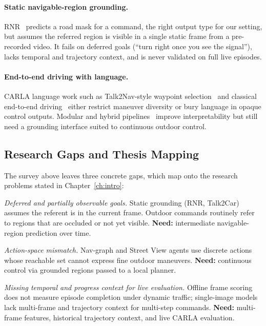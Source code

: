 \paragraph{Static navigable-region grounding.}
RNR~\cite{Rufus_2021} predicts a road mask for a command, the right output type for our setting, but assumes the referred region is visible in a single static frame from a pre-recorded video. It fails on deferred goals (``turn right once you see the signal''), lacks temporal and trajectory context, and is never validated on full live episodes.

\paragraph{End-to-end driving with language.}
CARLA language work such as Talk2Nav-style waypoint selection~\cite{sriram2019talk} and classical end-to-end driving~\cite{Codevilla_Muller_Lopez_Koltun_Dosovitskiy_2018,bojarski2016end} either restrict maneuver diversity or bury language in opaque control outputs. Modular and hybrid pipelines~\cite{Misra_Langford_Artzi_2017,fried2018speaker} improve interpretability but still need a grounding interface suited to continuous outdoor control.

\subsection{Research Gaps and Thesis Mapping}
\label{sec:research_gaps}

The survey above leaves three concrete gaps, which map onto the research problems stated in Chapter~\ref{ch:intro}:

\begin{description}[style=nextline, leftmargin=1.5em, font=\normalfont\bfseries]
    \item[Gap A $\rightarrow$ Problem A] \textit{Deferred and partially observable goals.} Static grounding (RNR, Talk2Car) assumes the referent is in the current frame. Outdoor commands routinely refer to regions that are occluded or not yet visible. \textbf{Need:} intermediate navigable-region prediction over time.
    \item[Gap B $\rightarrow$ Problem B] \textit{Action-space mismatch.} Nav-graph and Street View agents use discrete actions whose reachable set cannot express fine outdoor maneuvers. \textbf{Need:} continuous control via grounded regions passed to a local planner.
    \item[Gap C $\rightarrow$ Problem C] \textit{Missing temporal and progress context for live evaluation.} Offline frame scoring does not measure episode completion under dynamic traffic; single-image models lack multi-frame and trajectory context for multi-step commands. \textbf{Need:} multi-frame features, historical trajectory context, and live CARLA evaluation.
\end{description}

